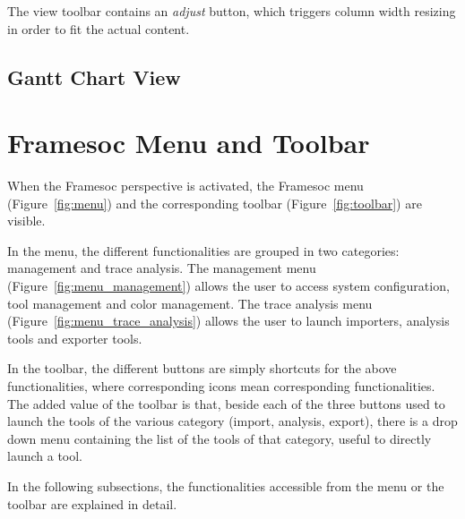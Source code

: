 \documentclass[twoside]{article}
\begin{document}
\begin{sloppypar}
The view toolbar contains an \emph{adjust} button, which triggers column width resizing in order to fit the actual content.

\subsection{Gantt Chart View}
\label{subsec:gantt}


\section{Framesoc Menu and Toolbar}
\label{sec:menu}


When the Framesoc perspective is activated, the Framesoc menu (Figure~\ref{fig:menu}) and the corresponding toolbar (Figure~\ref{fig:toolbar}) are visible. 

In the menu, the different functionalities are grouped in two categories: management and trace analysis.
The management menu (Figure~\ref{fig:menu_management}) allows the user to access system configuration, tool management and color management.
The trace analysis menu (Figure~\ref{fig:menu_trace_analysis}) allows the user to launch importers, analysis tools and exporter tools.

In the toolbar, the different buttons are simply shortcuts for the above functionalities, where corresponding icons mean corresponding functionalities.
The added value of the toolbar is that, beside each of the three buttons used to launch the tools of the various category (import, analysis, export), there is a drop down menu containing the list of the tools of that category, useful to directly launch a tool.

In the following subsections, the functionalities accessible from the menu or the toolbar are explained in detail.


\end{sloppypar}
\end{document}
